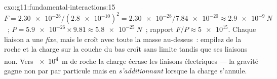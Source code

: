 \begin{solution}{exo:g11:fundamental-interactions:15}
$F = \num{2.30e-28}/(\num{2.8e-10})^2 = \num{2.30e-28}/\num{7.84e-20}
\approx \qty{2.9e-9}{N}$~; 
$P = \num{5.9e-26} \times 9.81 \approx \qty{5.8e-25}{N}$~; rapport
$F/P \approx \num{5e15}$. Chaque liaison a une  \emph{fixe}, mais
le  croît avec toute la masse
au-dessus~: empilez de la roche et la charge sur la couche du bas croît
sans limite tandis que ses liaisons non. Vers \qty{e4}{m} de roche la
charge écrase les liaisons électriques --- la gravité gagne non par
 par particule mais en \emph{s'additionnant} lorsque la charge
s'annule.
\end{solution}

